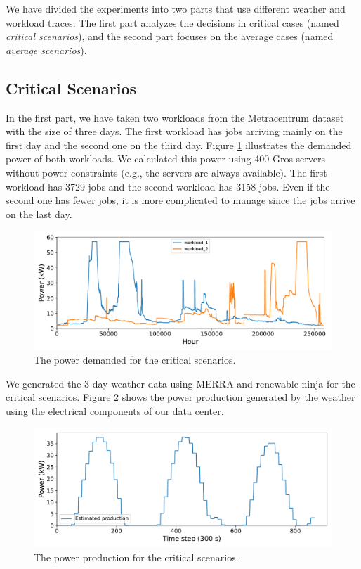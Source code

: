 We have divided the experiments into two parts that use different weather and workload traces. The first part analyzes the decisions in critical cases (named \emph{critical scenarios}), and the second part focuses on the average cases (named \emph{average scenarios}). 

\subsection{Critical Scenarios}

In the first part, we have taken two workloads from the Metracentrum dataset with the size of three days. The first workload has jobs arriving mainly on the first day and the second one on the third day. Figure \ref{fig:critical_workload} illustrates the demanded power of both workloads. We calculated this power using 400 Gros servers without power constraints (e.g., the servers are always available). The first workload has 3729 jobs and the second workload has 3158 jobs. Even if the second one has fewer jobs, it is more complicated to manage since the jobs arrive on the last day.

\begin{figure}[!htb]
    \centering
    \includegraphics[scale=0.58]{Images/Compensations/critical_jobs_arriving.pdf}
    \caption{The power demanded for the critical scenarios.}
    \label{fig:critical_workload}
\end{figure}

We generated the 3-day weather data using MERRA and renewable ninja for the critical scenarios. Figure \ref{fig:critical_weather} shows the power production generated by the weather using the electrical components of our data center. 

\begin{figure}[!htb]
    \centering
    \includegraphics[scale=0.58]{Images/Compensations/critical_power_production.pdf}
    \caption{The power production for the critical scenarios.}
    \label{fig:critical_weather}
\end{figure}

